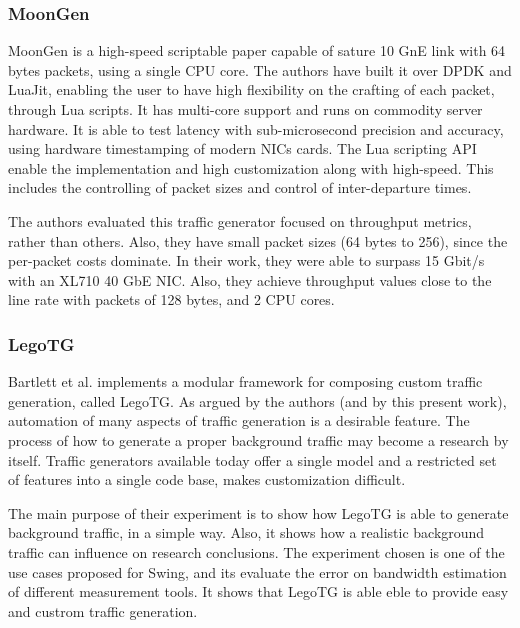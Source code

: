 \subsubsection{MoonGen}

MoonGen\cite{moongen-paper} is a high-speed scriptable paper capable of sature  10 GnE link with 64 bytes packets, using a single CPU core. The authors have built it over DPDK and LuaJit, enabling the user to have high flexibility on the crafting of each packet, through Lua scripts. It has multi-core support and runs on commodity server hardware. It is able to test latency with sub-microsecond precision and accuracy, using hardware timestamping of modern NICs cards. The Lua scripting API enable the implementation and high customization along with high-speed. This includes the controlling of packet sizes and control of inter-departure times.

The authors evaluated this traffic generator focused on throughput metrics, rather than others. Also, they have small packet sizes (64 bytes to 256), since the per-packet costs dominate. In their work, they were able to surpass 15 Gbit/s with an XL710 40 GbE NIC. Also, they achieve throughput values close to the line rate with packets of 128 bytes, and 2 CPU cores. 


\subsubsection{LegoTG}

Bartlett et al.\cite{legotg-paper} implements a modular framework for composing custom traffic generation, called LegoTG. As argued by the authors (and by this present work), automation of many aspects of traffic generation is a desirable feature. The process of how to generate a proper background traffic may become a research by itself. Traffic generators available today offer a single model and a restricted set of features into a single code base, makes customization difficult. 

The main purpose of their experiment is to show how LegoTG is able to generate background traffic, in a simple way. Also, it shows how a realistic background traffic can influence on research conclusions. The experiment chosen is one of the use cases proposed for Swing\cite{background-traffic-matter}, and its evaluate the error on bandwidth estimation of different measurement tools. It shows that LegoTG is able eble to provide easy and custrom traffic generation.




